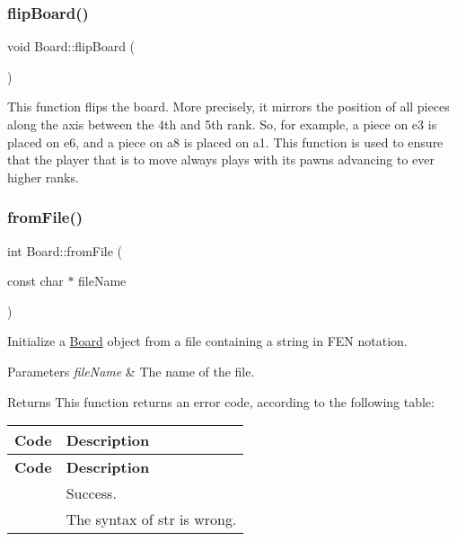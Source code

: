 \subsubsection{\texorpdfstring{flip\+Board()}{flipBoard()}}
{\footnotesize\ttfamily void Board\+::flip\+Board (\begin{DoxyParamCaption}{ }\end{DoxyParamCaption})\hspace{0.3cm}{\ttfamily [private]}}

This function flips the board. More precisely, it mirrors the position of all pieces along the axis between the 4th and 5th rank. So, for example, a piece on e3 is placed on e6, and a piece on a8 is placed on a1. This function is used to ensure that the player that is to move always plays with its pawns advancing to ever higher ranks. \mbox{\label{classBoard_a4043087fc35e9706d0e83ec07225fe33}} 
\subsubsection{\texorpdfstring{from\+File()}{fromFile()}}
{\footnotesize\ttfamily int Board\+::from\+File (\begin{DoxyParamCaption}\item[{const char $\ast$}]{file\+Name }\end{DoxyParamCaption})\hspace{0.3cm}{\ttfamily [private]}}

Initialize a \hyperlink{classBoard}{Board} object from a file containing a string in F\+EN notation. 
\begin{DoxyParams}{Parameters}
{\em file\+Name} & The name of the file. \\
\hline
\end{DoxyParams}
\begin{DoxyReturn}{Returns}
This function returns an error code, according to the following table\+: \tabulinesep=1mm
\begin{longtabu} spread 0pt [c]{*{2}{|X[-1]}|}
\hline
\rowcolor{\tableheadbgcolor}\PBS\raggedleft \textbf{ Code }&\textbf{ Description  }\\
\endfirsthead
\hline
\endfoot
\hline
\rowcolor{\tableheadbgcolor}\PBS\raggedleft \textbf{ Code }&\textbf{ Description  }\\
\endhead
\PBS{} &Success. \\
\PBS{} &The syntax of str is wrong. \\
\end{longtabu}

\end{DoxyReturn}
\mbox{\label{classBoard_a49045c77d568e4b5a00f176a2add54c8}} 
